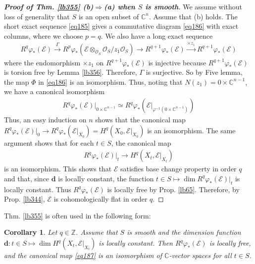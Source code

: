 \documentclass[12pt,b5paper,notitlepage]{report}
\theoremstyle{definition}
\theoremstyle{plain}
\newtheorem{co}[df]{Corollary}
\newcommand{\scr}{\mathscr}
\newcommand{\mbf}{\mathbf}
\newcommand{\Cbb}{\mathbb C}
\newcommand{\Zbb}{\mathbb Z}
\numberwithin{equation}{section}
\begin{document}
\begin{proof}[\textbf{Proof of Thm. \ref{lb355} (b)$\Rightarrow$(a) when $S$ is smooth}]
We assume without loss of generality that $S$ is an open subset of $\Cbb^n$. Assume that (b) holds. The short exact sequence \eqref{eq185} gives a commutative diagram \eqref{eq186} with exact columns, where we choose $p=q$. We also have a long exact sequence
\begin{align*}
R^q\varphi_*(\scr E)\xrightarrow{\Gamma} R^p\varphi_*(\scr E\otimes_{\scr O_S}\scr O_S/z_1\scr O_S)\rightarrow R^{q+1}\varphi_*(\scr E)\xrightarrow{\times z_1} R^{q+1}\varphi_*(\scr E)
\end{align*}
where the endomorphism $\times z_1$ on $R^{q+1}\varphi_*(\scr E)$ is injective because $R^{q+1}\varphi_*(\scr E)$ is torsion free by Lemma \ref{lb356}. Therefore, $\Gamma$ is surjective. So by Five lemma, the map $\Phi$ in \eqref{eq186} is an isomorphism. Thus, noting that $N(z_1)=0\times\Cbb^{n-1}$, we have a canonical isomorphism
\begin{align*}
R^q\varphi_*(\scr E)|_{0\times\Cbb^{n-1}}\simeq R^q\varphi_*(\scr E|_{\varphi^{-1}(0\times\Cbb^{n-1})})
\end{align*}
Thus, an easy induction on $n$ shows that the canonical map $R^q\varphi_*(\scr E)|_0\rightarrow R^q\varphi_*(\scr E|_{X_0})=H^q(X_0,\scr E|_{X_0})$ is an isomorphism. The same argument shows that for each $t\in S$, the canonical map 
\begin{align}
R^q\varphi_*(\scr E)|_t\rightarrow H^q(X_t,\scr E|_{X_t})  \label{eq187}
\end{align}
is an isomorphism. This shows that $\scr E$ satisfies base change property in order $q$ and that, since $\mbf d$ is locally constant, the function $t\in S\mapsto \dim R^q\varphi_*(\scr E)|_t$ is locally constant. Thus $R^q\varphi_*(\scr E)$ is locally free by Prop. \ref{lb65}. Therefore, by Prop. \ref{lb344}, $\scr E$ is cohomologically flat in order $q$.
\end{proof}



Thm. \ref{lb355} is often used in the following form:

\begin{co}
Let $q\in\Zbb$. Assume that $S$ is smooth and the dimension function $\mbf d:t\in S\mapsto \dim H^q(X_t,\scr E|_{X_t})$ is locally constant. Then $R^q\varphi_*(\scr E)$ is locally free, and the canonical map \eqref{eq187} is an isomorphism of $\Cbb$-vector spaces for all $t\in S$.
\end{co}
\end{document}
